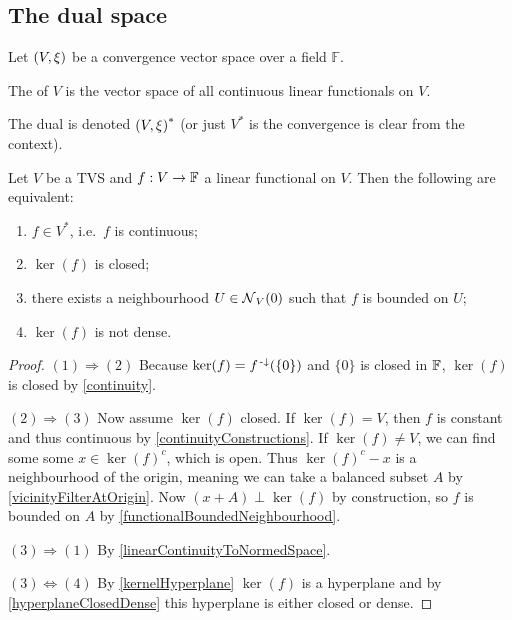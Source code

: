 \subsection{The dual space}
\begin{definition}
Let $\left( V,\xi \right)$ be a convergence vector space over a field $\mathbb{F}$.

The  of $V$ is the vector space of all continuous linear functionals on $V$.

The dual is denoted $\left( V,\xi \right)^{*}$ (or just $V^*$ is the convergence is clear from the context).
\end{definition}

\begin{proposition} \label{continuityLinearFunctionals}
Let $V$ be a TVS and $f:V\to \mathbb{F}$ a linear functional on $V$. Then the following are equivalent:
\begin{enumerate}
\item $f\in V^{*}$, i.e.\ $f$ is continuous;
\item $\ker(f)$ is closed;
\item there exists a neighbourhood $U\in \operatorname{\mathcal{N}}_V(0)$ such that $f$ is bounded on $U$;
\item $\ker(f)$ is not dense.
\end{enumerate}
\end{proposition}
\begin{proof}
$(1) \Rightarrow (2)$ Because $\ker(f) = f^{{\text{\hspace{0.15em}-}\downarrow}}(\{0\})$ and $\{0\}$ is closed in $\mathbb{F}$, $\ker(f)$ is closed by \ref{continuity}.

$(2) \Rightarrow (3)$ Now assume $\ker(f)$ closed. If $\ker(f) = V$, then $f$ is constant and thus continuous by \ref{continuityConstructions}. If $\ker(f) \neq V$, we can find some some $x\in \ker(f)^c$, which is open. Thus $\ker(f)^c - x$ is a neighbourhood of the origin, meaning we can take a balanced subset $A$ by \ref{vicinityFilterAtOrigin}. Now $(x+A)\perp \ker(f)$ by construction, so $f$ is bounded on $A$ by \ref{functionalBoundedNeighbourhood}.

$(3) \Rightarrow (1)$ By \ref{linearContinuityToNormedSpace}.

$(3) \Leftrightarrow (4)$ By \ref{kernelHyperplane} $\ker(f)$ is a hyperplane and by \ref{hyperplaneClosedDense} this hyperplane is either closed or dense.
\end{proof}


